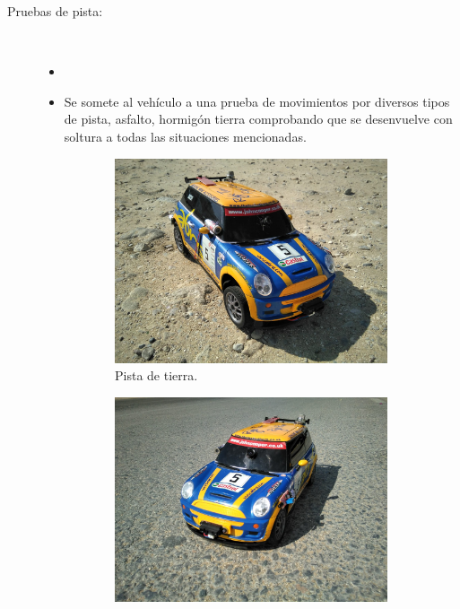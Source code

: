 \begin{description}
\item [ Pruebas de pista:] \\ 

\begin{itemize}
    \item[]
 \item Se somete al vehículo a una prueba de movimientos por diversos tipos de pista, asfalto, hormigón tierra comprobando que se desenvuelve con soltura a todas las situaciones mencionadas.
\end{itemize}


\begin{figure}[H]
    \centering
    \begin{subfigure}[b]{0.4\textwidth}
        \includegraphics[width=\textwidth]{imagenes/robot/tierra.jpg}
        \caption{Pista de tierra.}
        \label{fig:gull}
    \end{subfigure}
    \begin{subfigure}[b]{0.4\textwidth}
        \includegraphics[width=\textwidth]{imagenes/robot/asfalto.jpg}

\end{subfigure}
\end{figure}
\end{description}
